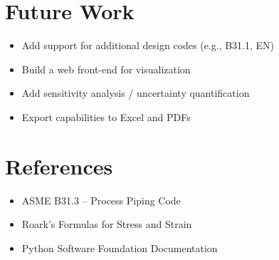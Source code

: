 \documentclass[11pt]{article}
\begin{document}
\section{Future Work}
\begin{itemize}
    \item Add support for additional design codes (e.g., B31.1, EN)
    \item Build a web front-end for visualization
    \item Add sensitivity analysis / uncertainty quantification
    \item Export capabilities to Excel and PDFs
\end{itemize}

\section{References}
\begin{itemize}
    \item ASME B31.3 – Process Piping Code
    \item Roark's Formulas for Stress and Strain
    \item Python Software Foundation Documentation
\end{itemize}
\end{document}
